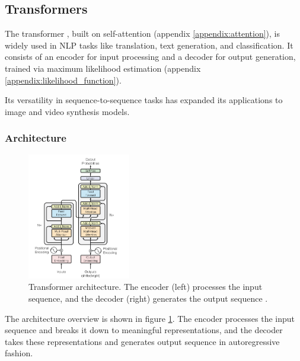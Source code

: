 \subsection{Transformers}
\label{appendix:transformers}

The transformer \cite{transformer}, built on self-attention (appendix \ref{appendix:attention}), is widely used in NLP tasks like translation, text generation, and classification. It consists of an encoder for input processing and a decoder for output generation, trained via maximum likelihood estimation (appendix \ref{appendix:likelihood_function}).

Its versatility in sequence-to-sequence tasks has expanded its applications to image and video synthesis models.





\subsubsection{Architecture}

\begin{figure}
    \centering
    \includegraphics[width=0.4\textwidth]{images/appendix/transformer/architecture.png}
    \caption{Transformer architecture. The encoder (left) processes the input sequence, and the decoder (right) generates the output sequence \cite{transformer}.}
    \label{fig:appendix_transformer_architecture}
\end{figure}

The architecture overview is shown in figure \ref{fig:appendix_transformer_architecture}. The encoder processes the input sequence and breaks it down to meaningful representations, and the decoder takes these representations and generates output sequence in autoregressive fashion. 








